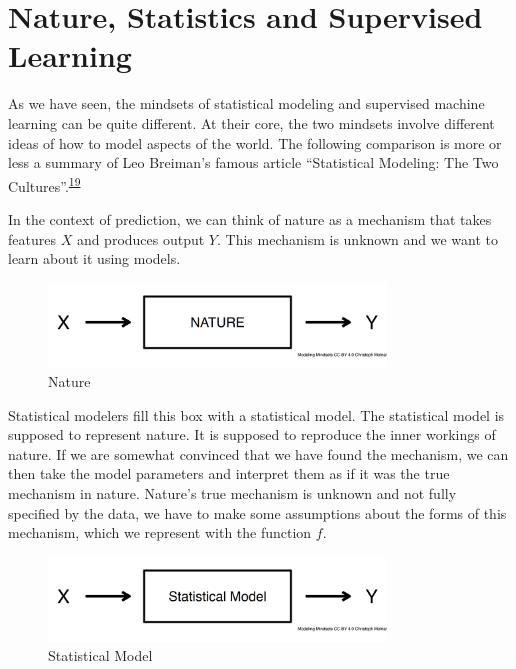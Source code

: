 \documentclass[
  10pt,
]{scrbook}
\begin{document}
\hypertarget{nature-statistics-and-supervised-learning}{%
\section{Nature, Statistics and Supervised Learning}\label{nature-statistics-and-supervised-learning}}

As we have seen, the mindsets of statistical modeling and supervised machine learning can be quite different.
At their core, the two mindsets involve different ideas of how to model aspects of the world.
The following comparison is more or less a summary of Leo Breiman's famous article ``Statistical Modeling: The Two Cultures''.\textsuperscript{\protect\hyperlink{ref-breiman2001statistical}{19}}

In the context of prediction, we can think of nature as a mechanism that takes features \(X\) and produces output \(Y\).
This mechanism is unknown and we want to learn about it using models.

\begin{figure}

{\centering \includegraphics[width=0.8\textwidth]{figures/nature-1} 

}

\caption{Nature}\label{fig:nature}
\end{figure}

Statistical modelers fill this box with a statistical model.
The statistical model is supposed to represent nature.
It is supposed to reproduce the inner workings of nature.
If we are somewhat convinced that we have found the mechanism, we can then take the model parameters and interpret them as if it was the true mechanism in nature.
Nature's true mechanism is unknown and not fully specified by the data, we have to make some assumptions about the forms of this mechanism, which we represent with the function \(f\).

\begin{figure}

{\centering \includegraphics[width=0.8\textwidth]{figures/stats-1} 

}

\caption{Statistical Model}\label{fig:stats}
\end{figure}
\end{document}
